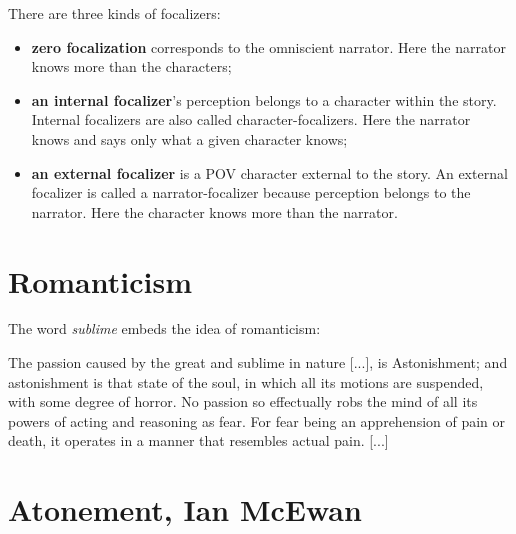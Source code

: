 \documentclass[a4paper]{article}
\begin{document}
There are three kinds of focalizers:
\begin{itemize}
    \item \textbf{zero focalization} corresponds to the omniscient narrator. Here the narrator knows more
    than the characters;
    \item \textbf{an internal focalizer}'s perception belongs to a character within the story. Internal focalizers
    are also called character-focalizers. Here the narrator knows and says only what a given
    character knows;
    \item \textbf{an external focalizer} is a POV character external to the story. An external focalizer is called
    a narrator-focalizer because perception belongs to the narrator. Here the character knows
    more than the narrator.
\end{itemize}

\pagebreak

\section{Romanticism}



The word \textit{sublime} embeds the idea of romanticism:

The passion caused by the great and sublime in nature [...], is Astonishment;
and astonishment is that state of the soul,
in which all its motions are suspended,
with some degree of horror.
No passion so effectually robs the mind of all its powers of acting and reasoning as fear.
For fear being an apprehension of pain or death,
it operates in a manner that resembles actual pain. [...] %

\pagebreak

\section{Atonement, Ian McEwan}
\end{document}

